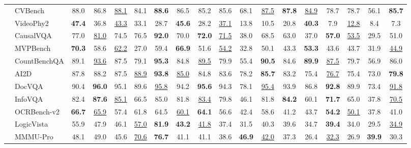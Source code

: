 \documentclass{llmxive}
\begin{document}
\begin{table}[p]
\begin{adjustbox}{width=\textwidth}
\begin{tabular}{@{}c l|>{\columncolor{columnours}}ccccc|>{\columncolor{columnours}}cccccc|>{\columncolor{columnours}}ccccc@{}}
        & CVBench & 88.0 & 86.8 & \underline{88.1} & 84.1 & \textbf{88.6} & 86.5 & 85.2 & 85.6 & 68.1 & \underline{87.5} & \textbf{87.8} & \underline{84.9} & 78.7 & 78.7 & 56.1 & \textbf{85.7} \\
        & VideoPhy2 & \textbf{47.4} & 36.8 & \underline{43.3} & 33.1 & 28.7 & \textbf{45.6} & 28.2 & \underline{37.1} & 13.8 & 10.5 & 20.8 & \textbf{40.3} & 7.9 & \underline{12.8} & 8.4 & 7.3 \\
        & CausalVQA & 77.0 & \underline{81.0} & 74.5 & 76.5 & \textbf{92.0} & 70.0 & \textbf{72.0} & \underline{71.5} & 38.0 & 68.5 & 63.0 & 37.0 & \textbf{57.0} & \underline{53.5} & 29.5 & 51.0 \\
        & MVPBench & \textbf{70.3} & 58.6 & \underline{62.2} & 27.0 & 59.4 & \textbf{66.9} & 51.6 & \underline{54.2} & 32.8 & 50.1 & 43.3 & \textbf{53.3} & 43.6 & 43.7 & 31.9 & \underline{44.9} \\
        & CountBenchQA & 89.1 & \underline{93.6} & 87.5 & 79.1 & \textbf{95.3} & 84.8 & \underline{89.5} & 79.9 & 55.4 & \textbf{90.5} & 84.6 & \textbf{89.9} & \underline{87.5} & 79.7 & 56.9 & 86.0 \\
        & AI2D & 87.8 & 88.2 & 87.5 & \underline{88.9} & \textbf{93.8} & \underline{85.0} & 84.8 & 83.6 & 78.2 & \textbf{85.7} & 83.2 & 75.4 & \underline{76.7} & 75.4 & 73.0 & \textbf{79.8} \\
        & DocVQA & 90.4 & \textbf{96.0} & 95.1 & 89.6 & \underline{95.8} & 94.2 & \textbf{95.6} & 94.3 & 78.1 & \underline{95.4} & 93.9 & 86.8 & \textbf{92.8} & 89.9 & 73.4 & \underline{91.8} \\
        & InfoVQA & 82.4 & \textbf{87.6} & \underline{85.1} & 66.5 & 85.0 & 81.8 & \underline{83.4} & 79.8 & 46.1 & 81.8 & \textbf{84.2} & 60.1 & \textbf{71.7} & 65.0 & 37.8 & \underline{70.5} \\
        & OCRBench-v2 & \textbf{66.7} & \underline{65.9} & 57.4 & 61.8 & 64.5 & \underline{60.1} & \textbf{64.1} & 56.6 & 42.4 & 58.6 & 41.2 & 43.7 & \textbf{54.2} & \underline{50.1} & 37.8 & 41.0 \\
        & LogicVista & 55.9 & 47.9 & 46.1 & \underline{57.0} & \textbf{81.9} & \textbf{43.2} & \underline{41.8} & 37.4 & 31.5 & 40.3 & 39.6 & 34.7 & \textbf{39.4} & 34.0 & 29.5 & \underline{34.9} \\
        & MMMU-Pro & 48.1 & 49.0 & 45.6 & \underline{70.6} & \textbf{76.7} & 41.1 & 41.1 & 38.6 & \textbf{46.9} & \underline{42.0} & 37.3 & 26.4 & \underline{32.3} & 26.9 & \textbf{39.9} & 30.3 \\

\end{tabular}
\end{adjustbox}
\end{table}
\end{document}
